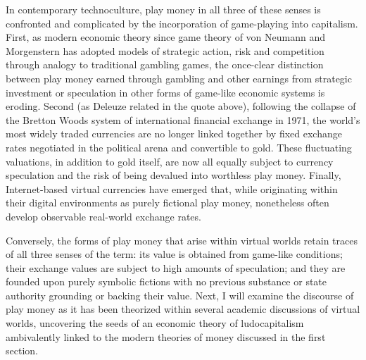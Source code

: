 In contemporary technoculture, play money in all three of these senses is confronted and complicated by the incorporation of game-playing into capitalism. First, as modern economic theory since game theory of von Neumann and Morgenstern has adopted models of strategic action, risk and competition through analogy to traditional gambling games, the once-clear distinction between play money earned through gambling and other earnings from strategic investment or speculation in other forms of game-like economic systems is eroding. Second (as Deleuze related in the quote above), following the collapse of the Bretton Woods system of international financial exchange in 1971, the world's most widely traded currencies are no longer linked together by fixed exchange rates negotiated in the political arena and convertible to gold. These fluctuating valuations, in addition to gold itself, are now all equally subject to currency speculation and the risk of being devalued into worthless play money. Finally, Internet-based virtual currencies have emerged that, while originating within their digital environments as purely fictional play money, nonetheless often develop observable real-world exchange rates.

Conversely, the forms of play money that arise within virtual worlds retain traces of all three senses of the term: its value is obtained from game-like conditions; their exchange values are subject to high amounts of speculation; and they are founded upon purely symbolic fictions with no previous substance or state authority grounding or backing their value. Next, I will examine the discourse of play money as it has been theorized within several academic discussions of virtual worlds, uncovering the seeds of an economic theory of ludocapitalism ambivalently linked to the modern theories of money discussed in the first section.

